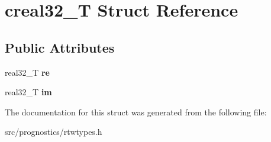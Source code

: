 \hypertarget{structcreal32__T}{}\section{creal32\+\_\+T Struct Reference}
\label{structcreal32__T}
\subsection*{Public Attributes}
\begin{DoxyCompactItemize}
\item 
\mbox{\label{structcreal32__T_a8f307e023841a72278193b51d01bf3a2}} 
real32\+\_\+T {\bfseries re}
\item 
\mbox{\label{structcreal32__T_a6568d13f2c13bdaa67f6b3c6916cd7ce}} 
real32\+\_\+T {\bfseries im}
\end{DoxyCompactItemize}


The documentation for this struct was generated from the following file\+:\begin{DoxyCompactItemize}
\item 
src/prognostics/rtwtypes.\+h\end{DoxyCompactItemize}
